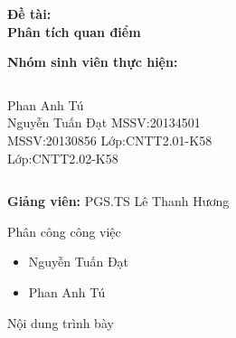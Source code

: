 \documentclass[compress]{beamer}
\author{Xử lý ngôn ngữ tự nhiên- PGS.TS Lê Thanh Hương}
\begin{document}
 
\begin{frame}
\begin{center}
\huge \bf Đề tài:\\ Phân tích quan điểm
\end{center}
\vspace{0.7cm}
\textbf{Nhóm sinh viên thực hiện:}\\[0.1cm]
\begin{columns}
Phan Anh Tú\\ 
Nguyễn Tuấn Đạt 
MSSV:20134501\\
MSSV:20130856
Lớp:CNTT2.01-K58\\
Lớp:CNTT2.02-K58
\end{columns}
\vspace{1cm}
\textbf{Giảng viên:} PGS.TS Lê Thanh Hương
\end{frame} 

\begin{frame}{Phân công công việc}
\begin{itemize}
\item Nguyễn Tuấn Đạt

\item Phan Anh Tú
\end{itemize}
\end{frame}
  
   
\begin{frame}{Nội dung trình bày}
\tableofcontents
\end{frame}
\end{document}
